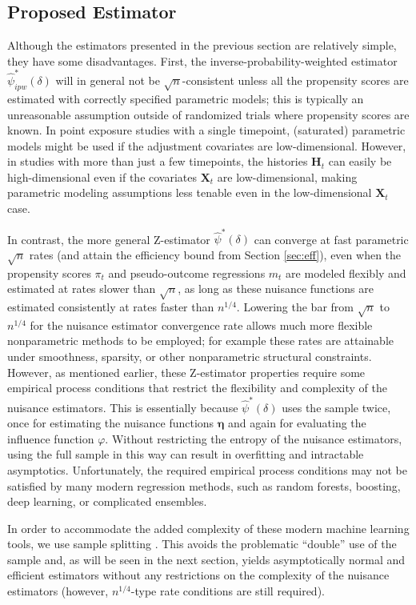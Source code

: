 \documentclass[12pt]{article}
\newcommand{\bX}{\mathbf{X}}
\newcommand{\bH}{\mathbf{H}}
\theoremstyle{remark}
\begin{document}
\subsection{Proposed Estimator}
\label{sec:proposed}

Although the estimators presented in the previous section are relatively simple, they have some disadvantages. First, the inverse-probability-weighted estimator $\hat\psi_{ipw}^*(\delta)$ will in general not be $\sqrt{n}$-consistent unless all the propensity scores are estimated with correctly specified parametric models; this is typically an unreasonable assumption outside of randomized trials where propensity scores are known. In point exposure studies with a single timepoint, (saturated) parametric models might be used if the adjustment covariates are low-dimensional. However, in studies with more than just a few timepoints, the histories $\bH_t$ can easily be high-dimensional even if the covariates $\bX_t$ are low-dimensional, making parametric modeling assumptions less tenable even in the low-dimensional $\bX_t$ case.

In contrast, the more general Z-estimator $\hat\psi^*(\delta)$ can converge at fast parametric $\sqrt{n}$ rates (and attain the efficiency bound from Section \ref{sec:eff}), even when the propensity scores $\pi_t$ and pseudo-outcome regressions $m_t$ are modeled flexibly and estimated at rates slower than $\sqrt{n}$, as long as these nuisance functions are estimated consistently at rates faster than $n^{1/4}$. Lowering the bar from $\sqrt{n}$ to $n^{1/4}$ for the nuisance estimator convergence rate allows much more flexible nonparametric methods to be employed; for example these rates are attainable under smoothness, sparsity, or other nonparametric structural constraints. However, as mentioned earlier, these Z-estimator properties require some empirical process conditions that restrict the flexibility and complexity of the nuisance estimators. This is essentially because $\hat\psi^*(\delta)$ uses the sample twice, once for estimating the nuisance functions $\boldsymbol\eta$ and again for evaluating the influence function $\varphi$. Without restricting the entropy of the nuisance estimators, using the full sample in this way can result in overfitting and intractable asymptotics. Unfortunately, the required empirical process conditions may not be satisfied by many modern regression  methods, such as random forests, boosting, deep learning, or complicated ensembles. 

In order to accommodate the added complexity of these modern machine learning tools, we use sample splitting \autocite{zheng2010asymptotic, chernozhukov2016double}. This avoids the problematic ``double'' use of the sample and, as will be seen in the next section, yields asymptotically normal and efficient estimators without any restrictions on the complexity of the nuisance estimators (however, $n^{1/4}$-type rate conditions are still required).
\end{document}
